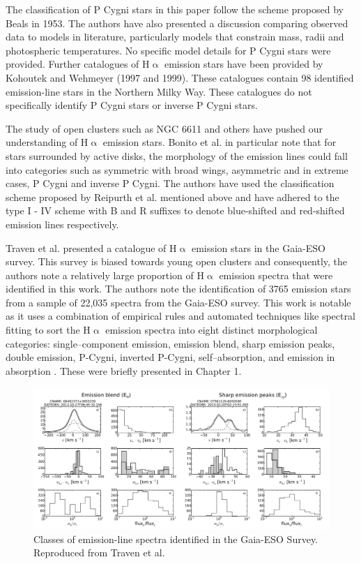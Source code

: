 The classification of P Cygni stars in this paper follow the scheme proposed by Beals in 1953\cite{1953PDAO....9....1B}. The authors have also presented a discussion comparing observed data to models in literature, particularly models that constrain mass, radii and photospheric temperatures. No specific model details for P Cygni stars were provided. Further catalogues of H$\upalpha$ emission stars have been provided by Kohoutek and Wehmeyer (1997 and 1999). These catalogues contain 98 identified emission-line stars in the Northern Milky Way. These catalogues do not specifically identify P Cygni stars or inverse P Cygni stars\cite{kohoutek1999catalogue}.

The study of open clusters such as NGC 6611 and others have pushed our understanding of H$\upalpha$ emission stars\cite{traven2015gaia}. Bonito et al. in particular\cite{bonito2013spectroscopic} note that for stars surrounded by active disks, the morphology of the emission lines could fall into categories such as symmetric with broad wings, asymmetric and in extreme cases, P Cygni and inverse P Cygni. The authors have used the classification scheme proposed by Reipurth et al. mentioned above and have adhered to the type I - IV scheme with B and R suffixes to denote blue-shifted and red-shifted emission lines respectively. 

Traven et al. presented a catalogue of H$\upalpha$ emission stars in the Gaia-ESO survey. This survey is biased towards young open clusters and consequently, the authors note a relatively large proportion of H$\upalpha$ emission spectra that were identified in this work. The authors note the identification of 3765 emission stars from a sample of 22,035 spectra from the Gaia-ESO survey. This work is notable as it uses a combination of empirical rules and automated techniques like spectral fitting to sort the H$\upalpha$ emission spectra into eight distinct morphological categories: single–component emission, emission blend, sharp emission peaks, double emission, P-Cygni, inverted P-Cygni, self–absorption, and emission in absorption \cite{traven2015gaia}. These were briefly presented in Chapter 1.

\begin{figure}[!htb]
\centering
\includegraphics[scale=.50]{figures/gaia eso1.png}
\caption{Classes of emission-line spectra identified in the Gaia-ESO Survey. Reproduced from Traven et al.}
\end{figure}

